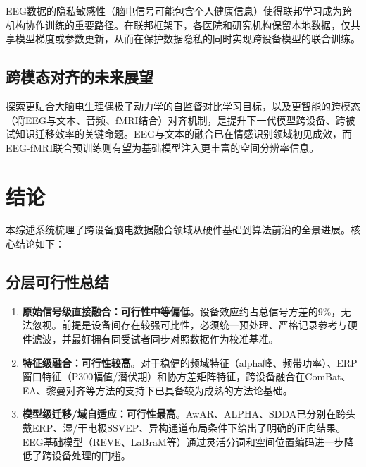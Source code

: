 \documentclass[12pt, a4paper]{article}
\begin{document}
EEG数据的隐私敏感性（脑电信号可能包含个人健康信息）使得联邦学习成为跨机构协作训练的重要路径\citep{Li2020federated}。在联邦框架下，各医院和研究机构保留本地数据，仅共享模型梯度或参数更新，从而在保护数据隐私的同时实现跨设备模型的联合训练。

\subsection{跨模态对齐的未来展望}

探索更贴合大脑电生理偶极子动力学的自监督对比学习目标，以及更智能的跨模态（将EEG与文本、音频、fMRI结合）对齐机制，是提升下一代模型跨设备、跨被试知识迁移效率的关键命题。EEG与文本的融合已在情感识别领域初见成效\citep{Niso2022HED}，而EEG-fMRI联合预训练则有望为基础模型注入更丰富的空间分辨率信息。

\section{结论}
\label{sec:conclusion}

本综述系统梳理了跨设备脑电数据融合领域从硬件基础到算法前沿的全景进展。核心结论如下：

\subsection{分层可行性总结}

\begin{enumerate}[leftmargin=2em]
  \item \textbf{原始信号级直接融合：可行性中等偏低}。设备效应约占总信号方差的9\%\citep{Ratti2017systems}，无法忽视。前提是设备间存在较强可比性，必须统一预处理、严格记录参考与硬件滤波，并最好拥有同受试者同步对照数据作为校准基准\citep{DAmico2026}。

  \item \textbf{特征级融合：可行性较高}。对于稳健的频域特征（alpha峰、频带功率）、ERP窗口特征（P300幅值/潜伏期）和协方差矩阵特征，跨设备融合在ComBat、EA、黎曼对齐等方法的支持下已具备较为成熟的方法论基础\citep{Jaramillo2024ComBat, He2020EA}。

  \item \textbf{模型级迁移/域自适应：可行性最高}。AwAR\citep{Wu2017AwAR}、ALPHA\citep{Liu2022ALPHA}、SDDA\citep{Liu2025SDDA}已分别在跨头戴ERP、湿/干电极SSVEP、异构通道布局条件下给出了明确的正向结果。EEG基础模型（REVE\citep{ElOuahidi2025REVE}、LaBraM\citep{Jiang2024LaBraM}等）通过灵活分词和空间位置编码进一步降低了跨设备处理的门槛。
\end{enumerate}
\end{document}
